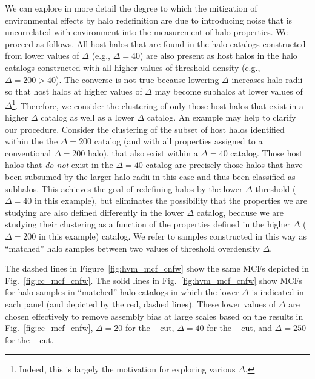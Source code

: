 \documentclass[usenatbib,fleqn]{mnras}
\begin{document}
We can explore in more detail the degree to which the mitigation of environmental effects by halo redefinition are due to introducing noise that is uncorrelated with environment into the measurement of halo properties. We proceed as follows. All host halos that are found in the halo catalogs constructed from lower values of $\Delta$ (e.g., $\Delta=40$) are also present as host halos in the halo catalogs constructed with all higher values of threshold density (e.g., $\Delta=200>40$). The converse is not true because lowering $\Delta$ increases halo radii so that host halos at higher values of $\Delta$ may become subhalos at lower values of $\Delta$\footnote{Indeed, this is largely the motivation for exploring various $\Delta$.}. Therefore, we consider the clustering of only those host halos that exist in a higher $\Delta$ catalog as well as a lower $\Delta$ catalog. An example may help to clarify our procedure. Consider the clustering of the subset of host halos identified within the the $\Delta=200$ catalog (and with all properties assigned to a conventional $\Delta=200$ halo), that also exist within a $\Delta=40$ catalog. Those host halos that {\em do not} exist in the $\Delta=40$ catalog are precisely those halos that have been subsumed by the larger halo radii in this case and thus been classified as subhalos. This achieves the goal of redefining halos by the lower $\Delta$ threshold ($\Delta=40$ in this example), but eliminates the possibility that the properties we are studying are also defined differently in the lower $\Delta$ catalog, because we are studying their clustering as a function of the properties defined in the higher $\Delta$ ($\Delta=200$ in this example) catalog. We refer to samples constructed in this way as ``matched'' halo samples between two values of threshold overdensity $\Delta$. 


The dashed lines in Figure~\ref{fig:hvm_mcf_cnfw} show the same MCFs depicted 
in Fig.~\ref{fig:cc_mcf_cnfw}. The solid lines in Fig.~\ref{fig:hvm_mcf_cnfw} show MCFs for halo samples in ``matched'' halo catalogs in which the lower $\Delta$ is indicated in each panel (and depicted by the red, dashed lines). These lower 
values of $\Delta$ are chosen effectively to remove assembly bias at large scales based on the results in Fig.~\ref{fig:cc_mcf_cnfw}, 
$\Delta=20$ for the \simA~ cut, 
$\Delta=40$ for the \simB~ cut, 
and $\Delta=250$ for the \simC~ cut. 
\end{document}
